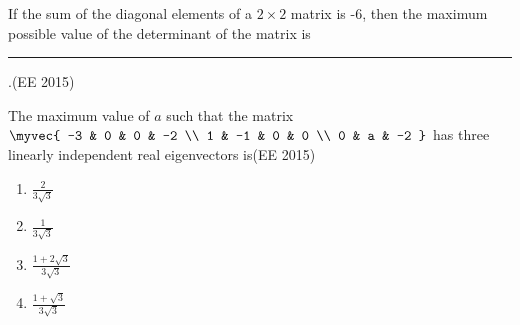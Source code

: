 \item If the sum of the diagonal elements of a    $2 \times 2   $ matrix is -6, then the maximum possible value of the determinant of the matrix is \rule{3cm}{0.15mm}.\hfill{{(EE 2015)}}
\item The maximum value of $a$ such that the matrix
$
\myvec{
-3 & 0 & 0 & -2 \\
1 & -1 & 0 & 0 \\
0 & a & -2
}
$
has three linearly independent real eigenvectors is\hfill{{(EE 2015)}}
\begin{multicols}{4}
    \begin{enumerate}
        \item $\frac{2}{3\sqrt{3}}$
        \item $\frac{1}{3\sqrt{3}}$
        \item $\frac{1+2\sqrt{3}}{3\sqrt{3}}$
        \item $\frac{1+\sqrt{3}}{3\sqrt{3}}$
    \end{enumerate}
\end{multicols}
